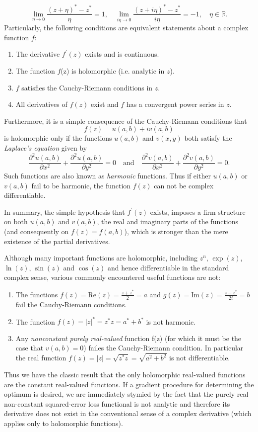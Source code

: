 \documentclass[11pt]{article}
\begin{document}
\begin{equation}
\lim_{\eta\to 0}\frac{(z+\eta)^*- z^*}{\eta}=1,\quad\lim_{i\eta\to 0}\frac{(z+ i\eta)^* - z^*}{i\eta} = -1, \quad \eta\in \mathbb R.
\end{equation}
Particularly, the following conditions are equivalent statements about a complex function $f$:
\begin{enumerate}
\item The derivative $f^\prime(z)$ exists and is continuous.
\item The function $f$(z) is holomorphic (i.e. analytic in  $z$).
\item $f$ satisfies the Cauchy-Riemann conditions in $z$.
\item All derivatives of $f(z)$ exist and $f$ has a convergent power series in $z$.
\end{enumerate}
Furthermore, it is a simple consequence of the Cauchy-Riemann conditions that
$$f(z) = u(a,b) + iv(a,b)$$
is holomorphic only if the functions $u(a,b)$ and $v(x,y)$ both satisfy the \textit{Laplace's equation} given by
$$\frac{\partial^2 u(a,b)}{\partial x^2} + \frac{\partial^2 u(a,b)}{\partial y^2} = 0 \quad\text{and}\quad\frac{\partial^2 v(a,b)}{\partial x^2} + \frac{\partial^2 v(a,b)}{\partial y^2} = 0 .$$
Such functions are also known as \textit{harmonic} functions. Thus if either $u(a,b)$ or $v(a,b)$ fail to be harmonic, the function $f(z)$ can not be complex differentiable.

In summary, the simple hypothesis that $f^\prime(z)$ exists, imposes a firm structure on both $u(a,b)$ and $v(a,b)$, the real and imaginary parts of the functions (and consequently on $f(z) = f(a,b)$), which is stronger than the mere existence of the partial derivatives.

Although many important functions are holomorphic, including $z^n$, $\exp(z)$, $\ln(z)$, $\sin(z)$ and $\cos(z)$ and hence differentiable in the standard complex sense, various  commonly encountered useful functions are not:
\begin{enumerate}
\item The functions $f(z)=\text{Re}(z) = \frac{z+z^*}{2} = a$ and $g(z) = \text{Im}(z)=\frac{z-z^*}{2i}=b$ fail the Cauchy-Riemann conditions.
\item The function $f(z) = |z|^* = z^*z = a^* + b^*$ is not harmonic.
\item Any \textit{nonconstant purely real-valued} function f(z) (for which it must be the case that $v(a,b)=0$) failes the Cauchy-Riemann condition. In particular the real function $f(z) = |z| = \sqrt{z^* z} = \sqrt{a^2 + b^2}$ is not differentiable.
\end{enumerate}
Thus we have the classic result that the only holomorphic real-valued functions are the constant real-valued functions. If a gradient procedure for determining the optimum is desired, we are immediately stymied by the fact that the purely real non-constant squared-error loss functional is not analytic and therefore its derivative does not exist in the conventional sense of a complex derivative (which applies only to holomorphic functions).
\end{document}
